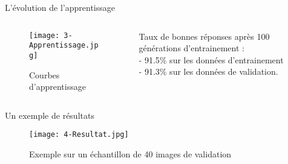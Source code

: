 \begin{frame}{L'évolution de l'apprentissage}
	\begin{columns}[T] %
		\begin{column}{.58\textwidth}
			\begin{figure}
				\centering
				\texttt{[image: 3-Apprentissage.jpg]}
				\caption{Courbes d'apprentissage}
			\end{figure}
		\end{column}
		\hfill
		\begin{column}{.54\textwidth}
			\bigskip	\bigskip	\bigskip
			\bigskip	\bigskip	\bigskip
			\bigskip	\bigskip	\bigskip
			Taux de bonnes réponses après 100 générations d'entrainement : \\
			- 91.5\% sur les données d'entrainement \\
			- 91.3\% sur les données de validation. \\
		\end{column}%
	\end{columns}
\end{frame}


\begin{frame}{Un exemple de résultats}
	\begin{figure}
		\centering
		\texttt{[image: 4-Resultat.jpg]}
		\caption{Exemple sur un échantillon de 40 images de validation}
	\end{figure}
\end{frame}

